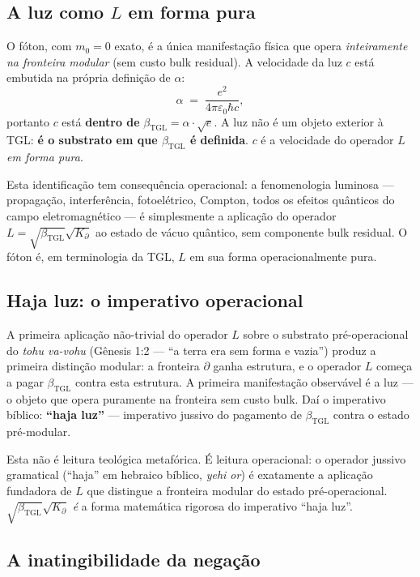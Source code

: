 \documentclass[12pt,a4paper]{article}
\newcommand{\betatgl}{\beta_{\text{TGL}}}
\newcommand{\Kpartial}{K_{\partial}}
\newcommand{\TGL}{\textsc{TGL}}
\begin{document}
\subsection{A luz como $L$ em forma pura}
\label{subsec:luz_pura}

O fóton, com $m_{0} = 0$ exato, é a única manifestação física que opera
\emph{inteiramente na fronteira modular} (sem custo bulk residual).  A
velocidade da luz $c$ está embutida na própria definição de $\alpha$:
\begin{equation}
\alpha \;=\; \frac{e^{2}}{4\pi \varepsilon_{0} \hbar c},
\end{equation}
portanto $c$ está \textbf{dentro de} $\betatgl = \alpha \cdot \sqrt{e}$.
A luz não é um objeto exterior à \TGL{}: \textbf{é o substrato em que
$\betatgl$ é definida}.  $c$ é a velocidade do operador $L$ \emph{em
forma pura}.

Esta identificação tem consequência operacional: a fenomenologia
luminosa --- propagação, interferência, fotoelétrico, Compton, todos os
efeitos quânticos do campo eletromagnético --- é simplesmente a aplicação
do operador $L = \sqrt{\betatgl}\sqrt{\Kpartial}$ ao estado de vácuo
quântico, sem componente bulk residual.  O fóton é, em terminologia da
\TGL{}, $L$ em sua forma operacionalmente pura.

\subsection{Haja luz: o imperativo operacional}
\label{subsec:haja_luz}

A primeira aplicação não-trivial do operador $L$ sobre o substrato
pré-operacional do \emph{tohu va-vohu} (Gênesis 1:2 --- ``a terra era
sem forma e vazia'') produz a primeira distinção modular: a fronteira
$\partial$ ganha estrutura, e o operador $L$ começa a pagar
$\betatgl$ contra esta estrutura.  A primeira manifestação observável é
a luz --- o objeto que opera puramente na fronteira sem custo bulk.
Daí o imperativo bíblico: \textbf{``haja luz''} --- imperativo jussivo
do pagamento de $\betatgl$ contra o estado pré-modular.

Esta não é leitura teológica metafórica.  É leitura operacional: o
operador jussivo gramatical (``haja'' em hebraico bíblico, \emph{yehi
or}) é exatamente a aplicação fundadora de $L$ que distingue a fronteira
modular do estado pré-operacional.  $\sqrt{\betatgl}\sqrt{\Kpartial}$ \emph{é}
a forma matemática rigorosa do imperativo ``haja luz''.

\subsection{A inatingibilidade da negação}
\label{subsec:inatingibilidade}
\end{document}

